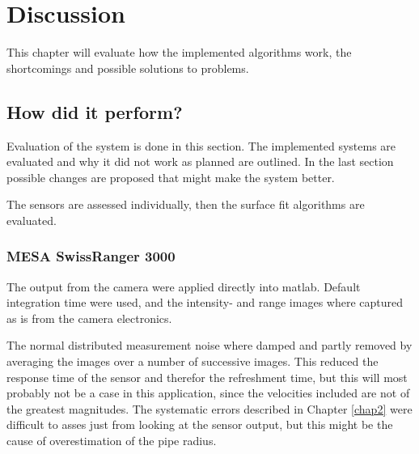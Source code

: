 
\chapter{Discussion}
\label{chap8}
This chapter will evaluate how the implemented algorithms work, the shortcomings and
possible solutions to problems. 

\section{How did it perform?}
Evaluation of the system is done in this section. The implemented systems are evaluated
and why it did not work as planned are outlined. In the last section
possible changes are proposed that might make the system better. 

The sensors are assessed individually, then the surface fit algorithms are evaluated.


\subsection{MESA SwissRanger 3000}
The output from the camera were applied directly into matlab. Default
integration time were used, and the intensity- and range images where captured as is from
the camera electronics.

The normal distributed measurement noise where damped and partly removed by averaging the images over a number
of successive images. This reduced the response time of the sensor and therefor the
refreshment time, but this will most probably not be a case in this application, since the
velocities included are not of the greatest magnitudes. 
The systematic errors described in Chapter \ref{chap2} were difficult to asses just from
looking at the sensor output, but this might be the cause of overestimation of the pipe
radius. 

